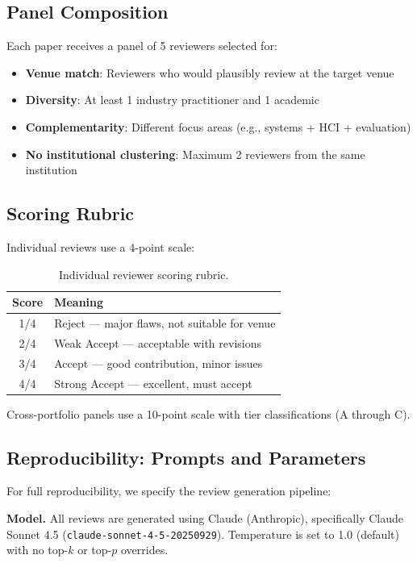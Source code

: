 \subsection{Panel Composition}

Each paper receives a panel of 5 reviewers selected for:
\begin{itemize}
    \item \textbf{Venue match}: Reviewers who would plausibly review at the target venue
    \item \textbf{Diversity}: At least 1 industry practitioner and 1 academic
    \item \textbf{Complementarity}: Different focus areas (e.g., systems + HCI + evaluation)
    \item \textbf{No institutional clustering}: Maximum 2 reviewers from the same institution
\end{itemize}

\subsection{Scoring Rubric}

Individual reviews use a 4-point scale:

\begin{table}[h]
\centering
\begin{tabular}{cl}
\toprule
Score & Meaning \\
\midrule
1/4 & Reject --- major flaws, not suitable for venue \\
2/4 & Weak Accept --- acceptable with revisions \\
3/4 & Accept --- good contribution, minor issues \\
4/4 & Strong Accept --- excellent, must accept \\
\bottomrule
\end{tabular}
\caption{Individual reviewer scoring rubric.}
\end{table}

Cross-portfolio panels use a 10-point scale with tier classifications (A through C).

\subsection{Reproducibility: Prompts and Parameters}

For full reproducibility, we specify the review generation pipeline:

\textbf{Model.} All reviews are generated using Claude (Anthropic), specifically Claude Sonnet 4.5 (\texttt{claude-sonnet-4-5-20250929}). Temperature is set to 1.0 (default) with no top-$k$ or top-$p$ overrides.

